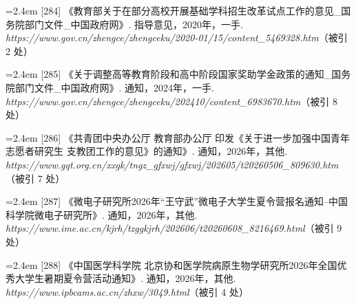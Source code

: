 {\vspace{0.6pt}
\noindent\hangindent=2.4em \label{src:S0368}{\color{cAccent}[284]} 《教育部关于在部分高校开展基础学科招生改革试点工作的意见\_国务院部门文件\_中国政府网》. 指导意见，2020年，一手. \textit{https://www.gov.cn/zhengce/zhengceku/2020-01/15/content\_5469328.htm}（被引 2 处）\par
\vspace{0.6pt}
\noindent\hangindent=2.4em \label{src:S0369}{\color{cAccent}[285]} 《关于调整高等教育阶段和高中阶段国家奖助学金政策的通知\_国务院部门文件\_中国政府网》. 通知，2024年，一手. \textit{https://www.gov.cn/zhengce/zhengceku/202410/content\_6983670.htm}（被引 8 处）\par
\vspace{0.6pt}
\vspace{3.5pt}\par
\nopagebreak\vspace{1pt}
\noindent\hangindent=2.4em \label{src:S0370}{\color{cAccent}[286]} 《共青团中央办公厅 教育部办公厅
印发《关于进一步加强中国青年志愿者研究生
支教团工作的意见》的通知》. 通知，2026年，其他. \textit{https://www.gqt.org.cn/xxgk/tngz\_gfxwj/gfxwj/202605/t20260506\_809630.htm}（被引 7 处）\par
\vspace{0.6pt}
\vspace{3.5pt}\par
\nopagebreak\vspace{1pt}
\noindent\hangindent=2.4em \label{src:S0373}{\color{cAccent}[287]} 《微电子研究所2026年“王守武”微电子大学生夏令营报名通知--中国科学院微电子研究所》. 通知，2026年，其他. \textit{https://www.ime.ac.cn/kjrh/tzggkjrh/202606/t20260608\_8216469.html}（被引 9 处）\par
\vspace{0.6pt}
\vspace{3.5pt}\par
\nopagebreak\vspace{1pt}
\noindent\hangindent=2.4em \label{src:S0375}{\color{cAccent}[288]} 《中国医学科学院 北京协和医学院病原生物学研究所2026年全国优秀大学生暑期夏令营活动通知》. 通知，2026年，其他. \textit{https://www.ipbcams.ac.cn/zhxw/3049.html}（被引 4 处）\par
\vspace{0.6pt}
\vspace{3.5pt}\par
}
